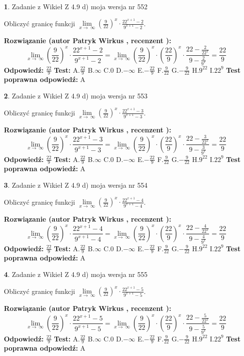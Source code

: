\documentclass[12pt, a4paper]{article}
\theoremstyle{definition} %
\newtheorem{zad}{}
\newcommand{\zadStart}[1]{\begin{zad}#1\newline}
\newcommand{\zadStop}{\end{zad}}
\newcommand{\rozwStart}[2]{\noindent \textbf{Rozwiązanie (autor #1 , recenzent #2): }\newline}
\newcommand{\rozwStop}{\newline}
\newcommand{\odpStart}{\noindent \textbf{Odpowiedź:}\newline}
\newcommand{\odpStop}{\newline}
\newcommand{\testStart}{\noindent \textbf{Test:}\newline}
\newcommand{\testStop}{\newline}
\newcommand{\kluczStart}{\noindent \textbf{Test poprawna odpowiedź:}\newline}
\newcommand{\kluczStop}{\newline}
\begin{document}
\zadStart{Zadanie z Wikieł Z 4.9 d) moja wersja nr 552}


Obliczyć granicę funkcji  $\lim\limits_{x\to\ \infty}(\frac{9}{22})^{x}\cdot\frac{22^{x+1}-2}{9^{x+1}-2}$.
\zadStop
\rozwStart{Patryk Wirkus}{}
$$\lim\limits_{x\to\ \infty}(\frac{9}{22})^{x}\cdot\frac{22^{x+1}-2}{9^{x+1}-2}=\lim\limits_{x\to\ \infty}(\frac{9}{22})^{x}\cdot(\frac{22}{9})^{x} \cdot \frac{22-\frac{2}{22^{x}}}{9-\frac{2}{9^{x}}} = \frac{22}{9}$$
\rozwStop
\odpStart
$\frac{22}{9}$
\odpStop
\testStart
A.$\frac{22}{9}$ B.$\infty$ C.$0$ D.$-\infty$ E.$-\frac{22}{9}$
F.$\frac{9}{22}$ G.$-\frac{9}{22}$
H.$9^{22}$
I.$22^{9}$
\testStop
\kluczStart
A
\kluczStop



\zadStart{Zadanie z Wikieł Z 4.9 d) moja wersja nr 553}


Obliczyć granicę funkcji  $\lim\limits_{x\to\ \infty}(\frac{9}{22})^{x}\cdot\frac{22^{x+1}-3}{9^{x+1}-3}$.
\zadStop
\rozwStart{Patryk Wirkus}{}
$$\lim\limits_{x\to\ \infty}(\frac{9}{22})^{x}\cdot\frac{22^{x+1}-3}{9^{x+1}-3}=\lim\limits_{x\to\ \infty}(\frac{9}{22})^{x}\cdot(\frac{22}{9})^{x} \cdot \frac{22-\frac{3}{22^{x}}}{9-\frac{3}{9^{x}}} = \frac{22}{9}$$
\rozwStop
\odpStart
$\frac{22}{9}$
\odpStop
\testStart
A.$\frac{22}{9}$ B.$\infty$ C.$0$ D.$-\infty$ E.$-\frac{22}{9}$
F.$\frac{9}{22}$ G.$-\frac{9}{22}$
H.$9^{22}$
I.$22^{9}$
\testStop
\kluczStart
A
\kluczStop



\zadStart{Zadanie z Wikieł Z 4.9 d) moja wersja nr 554}


Obliczyć granicę funkcji  $\lim\limits_{x\to\ \infty}(\frac{9}{22})^{x}\cdot\frac{22^{x+1}-4}{9^{x+1}-4}$.
\zadStop
\rozwStart{Patryk Wirkus}{}
$$\lim\limits_{x\to\ \infty}(\frac{9}{22})^{x}\cdot\frac{22^{x+1}-4}{9^{x+1}-4}=\lim\limits_{x\to\ \infty}(\frac{9}{22})^{x}\cdot(\frac{22}{9})^{x} \cdot \frac{22-\frac{4}{22^{x}}}{9-\frac{4}{9^{x}}} = \frac{22}{9}$$
\rozwStop
\odpStart
$\frac{22}{9}$
\odpStop
\testStart
A.$\frac{22}{9}$ B.$\infty$ C.$0$ D.$-\infty$ E.$-\frac{22}{9}$
F.$\frac{9}{22}$ G.$-\frac{9}{22}$
H.$9^{22}$
I.$22^{9}$
\testStop
\kluczStart
A
\kluczStop



\zadStart{Zadanie z Wikieł Z 4.9 d) moja wersja nr 555}


Obliczyć granicę funkcji  $\lim\limits_{x\to\ \infty}(\frac{9}{22})^{x}\cdot\frac{22^{x+1}-5}{9^{x+1}-5}$.
\zadStop
\rozwStart{Patryk Wirkus}{}
$$\lim\limits_{x\to\ \infty}(\frac{9}{22})^{x}\cdot\frac{22^{x+1}-5}{9^{x+1}-5}=\lim\limits_{x\to\ \infty}(\frac{9}{22})^{x}\cdot(\frac{22}{9})^{x} \cdot \frac{22-\frac{5}{22^{x}}}{9-\frac{5}{9^{x}}} = \frac{22}{9}$$
\rozwStop
\odpStart
$\frac{22}{9}$
\odpStop
\testStart
A.$\frac{22}{9}$ B.$\infty$ C.$0$ D.$-\infty$ E.$-\frac{22}{9}$
F.$\frac{9}{22}$ G.$-\frac{9}{22}$
H.$9^{22}$
I.$22^{9}$
\testStop
\kluczStart
A
\kluczStop
\end{document}

